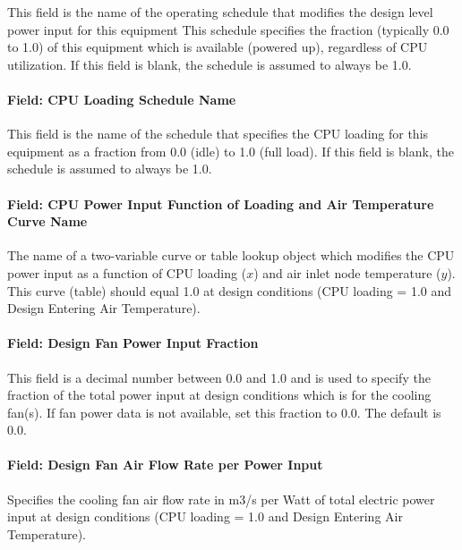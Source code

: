 This field is the name of the operating schedule that modifies the design level power input for this equipment This schedule specifies the fraction (typically 0.0 to 1.0) of this equipment which is available (powered up), regardless of CPU utilization. If this field is blank, the schedule is assumed to always be 1.0.

\paragraph{Field: CPU Loading Schedule Name}\label{field-cpu-loading-schedule-name}

This field is the name of the schedule that specifies the CPU loading for this equipment as a fraction from 0.0 (idle) to 1.0 (full load). If this field is blank, the schedule is assumed to always be 1.0.

\paragraph{Field: CPU Power Input Function of Loading and Air Temperature Curve Name}\label{field-cpu-power-input-function-of-loading-and-air-temperature-curve-name}

The name of a two-variable curve or table lookup object which modifies the CPU power input as a function of CPU loading ($x$) and air inlet node temperature ($y$). This curve (table) should equal 1.0 at design conditions (CPU loading = 1.0 and Design Entering Air Temperature).

\paragraph{Field: Design Fan Power Input Fraction}\label{field-design-fan-power-input-fraction}

This field is a decimal number between 0.0 and 1.0 and is used to specify the fraction of the total power input at design conditions which is for the cooling fan(s). If fan power data is not available, set this fraction to 0.0. The default is 0.0.

\paragraph{Field: Design Fan Air Flow Rate per Power Input}\label{field-design-fan-air-flow-rate-per-power-input}

Specifies the cooling fan air flow rate in m3/s per Watt of total electric power input at design conditions (CPU loading = 1.0 and Design Entering Air Temperature).

